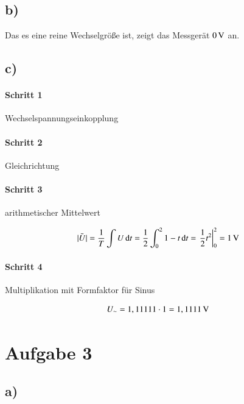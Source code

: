 \subsection*{b)}

Das es eine reine Wechselgröße ist, zeigt das Messgerät $\unit[0]{V}$ an.


\subsection*{c)}


\paragraph{Schritt 1}

Wechselspannungseinkopplung

\paragraph{Schritt 2}

Gleichrichtung

\paragraph{Schritt 3}

arithmetischer Mittelwert

\begin{align*}
\bar{|U|} = \frac{1}{T} \int U \d t = \half \int_{0}^{2} 1 - t \d t = \left. \half t^2 \right|_0^2 = \unit[1]{V}
\end{align*}

\paragraph{Schritt 4}

Multiplikation mit Formfaktor für Sinus

\begin{align*}
U_\sim = 1,11111 \cdot 1 = \unit[1,1111]{V}
\end{align*}


\section{Aufgabe 3}

\subsection*{a)}


